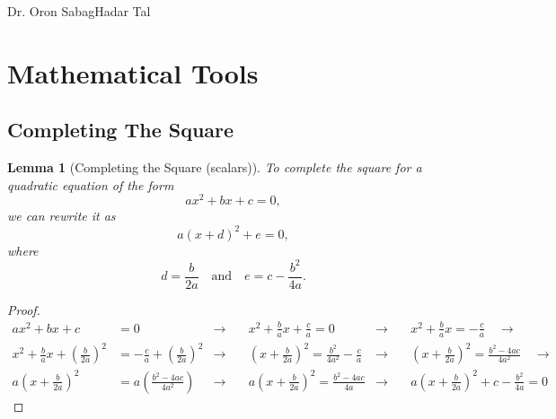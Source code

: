 \documentclass[a4 paper]{article}
\numberwithin{equation}{section}
\theoremstyle{boldStyle}
\theoremstyle{boldBlueStyle}
\newtheorem{lemma}{Lemma}[section]
\theoremstyle{boldPurpleStyle}
\theoremstyle{boldRedStyle}
\begin{document}
{Dr. Oron Sabag}{}{Hadar Tal}{}

\tableofcontents


\newpage
\section{Mathematical Tools}

\subsection{Completing The Square}

\begin{lemma}[Completing the Square (scalars)]
  To complete the square for a quadratic equation of the form
  \[
  ax^2 + bx + c = 0,
  \]
  we can rewrite it as
  \[
  a(x + d)^2 + e = 0,
  \]
  where
  \[
  d = \frac{b}{2a} \quad \text{and} \quad e = c - \frac{b^2}{4a}.
  \]
\end{lemma}

\begin{proof}
  \begin{align*}
    ax^2 + bx + c &= 0 &\rightarrow\quad & x^2 + \frac{b}{a}x + \frac{c}{a} = 0 &\rightarrow\quad& x^2 + 
    \frac{b}{a}x = -\frac{c}{a} \quad \rightarrow \\
    x^2 + \frac{b}{a}x + \left( \frac{b}{2a} \right)^2 &= -\frac{c}{a} + \left( \frac{b}{2a} \right)^2 
    &\rightarrow\quad& \left( x + \frac{b}{2a} \right)^2 = \frac{b^2}{4a^2} - \frac{c}{a} &\rightarrow\quad& 
    \left( x + \frac{b}{2a} \right)^2 = \frac{b^2 - 4ac}{4a^2} \quad \rightarrow \\
    a\left( x + \frac{b}{2a} \right)^2 &= a\left( \frac{b^2 - 4ac}{4a^2} \right) 
    &\rightarrow\quad& a\left( x + \frac{b}{2a} \right)^2 = \frac{b^2 - 4ac}{4a} 
    &\rightarrow\quad& a\left( x + \frac{b}{2a} \right)^2 + c - \frac{b^2}{4a} = 0
    \end{align*}
\end{proof}
\end{document}
